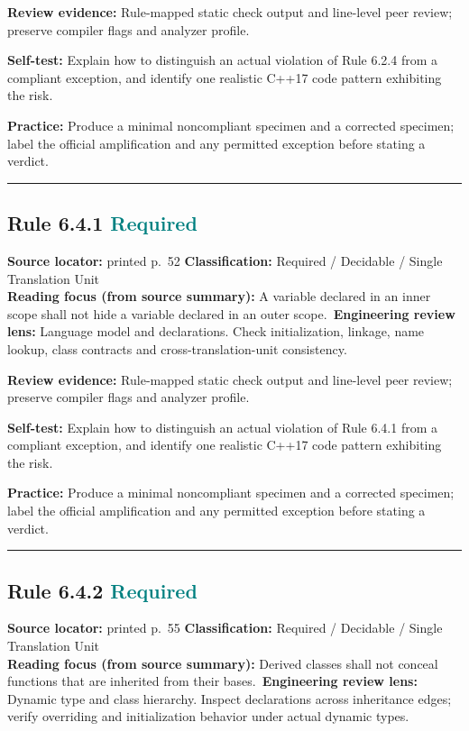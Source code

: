 \documentclass[10pt,letterpaper]{article}
\begin{document}
\textbf{Review evidence:} Rule-mapped static check output and line-level peer review; preserve compiler flags and analyzer profile.

\textbf{Self-test:} Explain how to distinguish an actual violation of Rule 6.2.4 from a compliant exception, and identify one realistic C++17 code pattern exhibiting the risk.\par
\textbf{Practice:} Produce a minimal noncompliant specimen and a corrected specimen; label the official amplification and any permitted exception before stating a verdict.
\smallskip\hrule\smallskip
\subsection*{Rule 6.4.1 \enspace \texorpdfstring{\small\textcolor{teal}{Required}}{Required}}
\noindent\textbf{Source locator:} printed p.~52 \quad\textbf{Classification:} Required / Decidable / Single Translation Unit\\
\textbf{Reading focus (from source summary):} A variable declared in an inner scope shall not hide a variable declared in an outer scope.\
\textbf{Engineering review lens:} Language model and declarations. Check initialization, linkage, name lookup, class contracts and cross-translation-unit consistency.

\textbf{Review evidence:} Rule-mapped static check output and line-level peer review; preserve compiler flags and analyzer profile.

\textbf{Self-test:} Explain how to distinguish an actual violation of Rule 6.4.1 from a compliant exception, and identify one realistic C++17 code pattern exhibiting the risk.\par
\textbf{Practice:} Produce a minimal noncompliant specimen and a corrected specimen; label the official amplification and any permitted exception before stating a verdict.
\smallskip\hrule\smallskip
\subsection*{Rule 6.4.2 \enspace \texorpdfstring{\small\textcolor{teal}{Required}}{Required}}
\noindent\textbf{Source locator:} printed p.~55 \quad\textbf{Classification:} Required / Decidable / Single Translation Unit\\
\textbf{Reading focus (from source summary):} Derived classes shall not conceal functions that are inherited from their bases.\
\textbf{Engineering review lens:} Dynamic type and class hierarchy. Inspect declarations across inheritance edges; verify overriding and initialization behavior under actual dynamic types.
\end{document}
